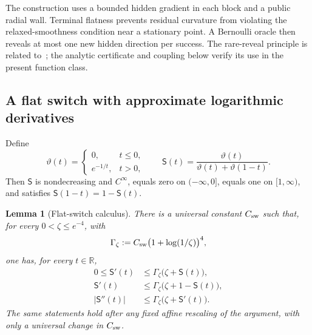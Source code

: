 \documentclass[11pt,a4paper]{article}
\newcommand{\R}{\mathbb{R}}
\newtheorem{lemma}[theorem]{Lemma}
\theoremstyle{remark}
\begin{document}
The construction uses a bounded hidden gradient in each block and a public
radial wall. Terminal flatness prevents residual curvature from violating
the relaxed-smoothness condition near a stationary point. A Bernoulli oracle
then reveals at most one new hidden direction per success. The rare-reveal
principle is related to~\cite{arjevani2022}; the analytic certificate and
coupling below verify its use in the present function class.

\subsection{A flat switch with approximate logarithmic derivatives}

Define
\begin{equation}
 \vartheta(t)=
 \begin{cases}
  0,&t\le0,\\
  e^{-1/t},&t>0,
 \end{cases}
 \qquad
 \mathsf S(t)=
 \frac{\vartheta(t)}{\vartheta(t)+\vartheta(1-t)}.
 \label{eq:flat-switch}
\end{equation}
Then $\mathsf S$ is nondecreasing and $C^\infty$, equals zero on
$(-\infty,0]$, equals one on $[1,\infty)$, and satisfies
$\mathsf S(1-t)=1-\mathsf S(t)$.

\begin{lemma}[Flat-switch calculus]
\label{lem:flat-switch-calculus}
There is a universal constant $C_{\rm sw}$ such that, for every
$0<\zeta\le e^{-4}$, with
\begin{equation}
 \Gamma_\zeta
 :=C_{\rm sw}\bigl(1+\log(1/\zeta)\bigr)^4,
 \label{eq:flat-switch-Gamma}
\end{equation}
one has, for every $t\in\R$,
\begin{align}
 0\le \mathsf S'(t)
 &\le \Gamma_\zeta\bigl(\zeta+\mathsf S(t)\bigr),
 \label{eq:switch-first-left}\\
 \mathsf S'(t)
 &\le \Gamma_\zeta\bigl(\zeta+1-\mathsf S(t)\bigr),
 \label{eq:switch-first-right}\\
 |\mathsf S''(t)|
 &\le \Gamma_\zeta\bigl(\zeta+\mathsf S'(t)\bigr).
 \label{eq:switch-second}
\end{align}
The same statements hold after any fixed affine rescaling of the argument,
with only a universal change in $C_{\rm sw}$.
\end{lemma}
\end{document}
